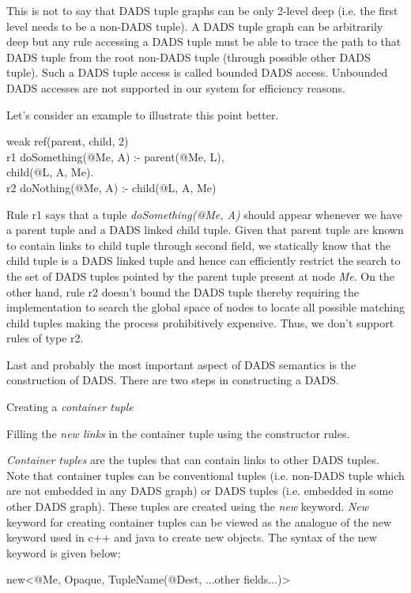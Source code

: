This is not to say that DADS tuple graphs can be only 2-level deep (i.e. the first level needs to be a non-DADS tuple). A DADS tuple graph can be arbitrarily deep but any rule accessing a DADS tuple must be able to trace the path to that DADS tuple from the root non-DADS tuple (through possible other DADS tuple). Such a DADS tuple access is called bounded DADS access. Unbounded DADS accesses are not supported in our system for efficiency reasons.

Let's consider an example to illustrate this point better.
\begin{code}
weak ref(parent, child, 2)\\
r1 doSomething(@Me, A) :- parent(@Me, L), \\
\> child(@L, A, Me).\\
r2 doNothing(@Me, A) :-  child(@L, A, Me)
\end{code}

Rule r1 says that a tuple {\em doSomething(@Me, A)} should appear whenever we have a parent tuple and a DADS linked child tuple. Given that parent tuple are known to contain links to child tuple through second field, we statically know that the child tuple is a DADS linked tuple and hence can efficiently restrict the search to the set of DADS tuples pointed by the parent tuple present at node {\em Me}. On the other hand, rule r2 doesn't bound the DADS tuple thereby requiring the implementation to search the global space of nodes to locate all possible matching child tuples making the process prohibitively expensive. Thus, we don't support rules of type r2.

Last and probably the most important aspect of DADS semantics is the construction of DADS. There are two steps in constructing a DADS. 
\be
\item Creating a {\em container tuple}
\item Filling the {\em new links} in the container tuple using the constructor rules. 
\ee

{\em Container tuples} are the tuples that can contain links to other DADS tuples. Note that container tuples can be conventional tuples (i.e. non-DADS tuple which are not embedded in any DADS graph) or DADS tuples (i.e. embedded in some other DADS graph). These tuples are created using the {\em new} keyword. {\em New} keyword for creating container tuples can be viewed as the analogue of the new keyword used in c++ and java to create new objects. The syntax of the new keyword is given below:
\begin{center}
new<@Me, Opaque, TupleName(@Dest, ...other fields...)>
\end{center}

